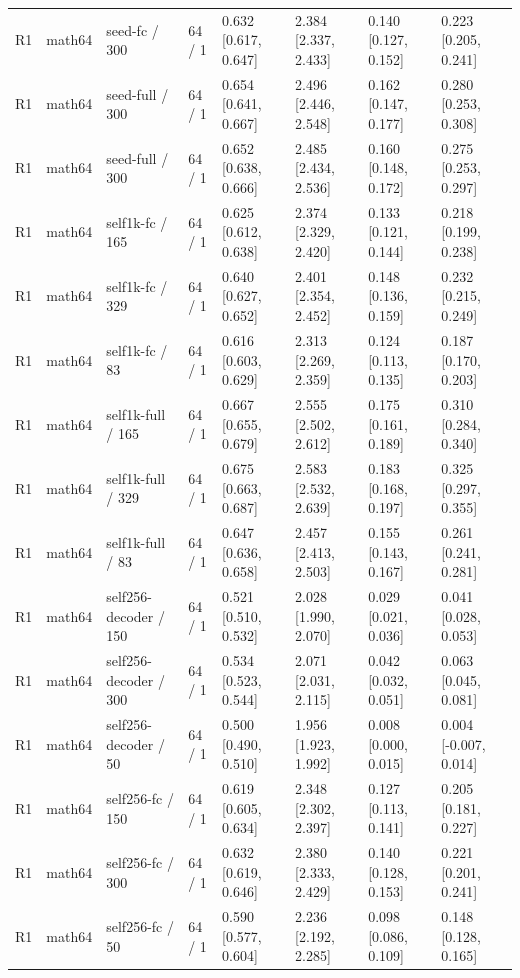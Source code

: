 \begin{tabular}{llllllll}
R1 & math64 & seed-fc / 300 & 64 / 1 & 0.632 [0.617, 0.647] & 2.384 [2.337, 2.433] & 0.140 [0.127, 0.152] & 0.223 [0.205, 0.241] \\
R1 & math64 & seed-full / 300 & 64 / 1 & 0.654 [0.641, 0.667] & 2.496 [2.446, 2.548] & 0.162 [0.147, 0.177] & 0.280 [0.253, 0.308] \\
R1 & math64 & seed-full / 300 & 64 / 1 & 0.652 [0.638, 0.666] & 2.485 [2.434, 2.536] & 0.160 [0.148, 0.172] & 0.275 [0.253, 0.297] \\
R1 & math64 & self1k-fc / 165 & 64 / 1 & 0.625 [0.612, 0.638] & 2.374 [2.329, 2.420] & 0.133 [0.121, 0.144] & 0.218 [0.199, 0.238] \\
R1 & math64 & self1k-fc / 329 & 64 / 1 & 0.640 [0.627, 0.652] & 2.401 [2.354, 2.452] & 0.148 [0.136, 0.159] & 0.232 [0.215, 0.249] \\
R1 & math64 & self1k-fc / 83 & 64 / 1 & 0.616 [0.603, 0.629] & 2.313 [2.269, 2.359] & 0.124 [0.113, 0.135] & 0.187 [0.170, 0.203] \\
R1 & math64 & self1k-full / 165 & 64 / 1 & 0.667 [0.655, 0.679] & 2.555 [2.502, 2.612] & 0.175 [0.161, 0.189] & 0.310 [0.284, 0.340] \\
R1 & math64 & self1k-full / 329 & 64 / 1 & 0.675 [0.663, 0.687] & 2.583 [2.532, 2.639] & 0.183 [0.168, 0.197] & 0.325 [0.297, 0.355] \\
R1 & math64 & self1k-full / 83 & 64 / 1 & 0.647 [0.636, 0.658] & 2.457 [2.413, 2.503] & 0.155 [0.143, 0.167] & 0.261 [0.241, 0.281] \\
R1 & math64 & self256-decoder / 150 & 64 / 1 & 0.521 [0.510, 0.532] & 2.028 [1.990, 2.070] & 0.029 [0.021, 0.036] & 0.041 [0.028, 0.053] \\
R1 & math64 & self256-decoder / 300 & 64 / 1 & 0.534 [0.523, 0.544] & 2.071 [2.031, 2.115] & 0.042 [0.032, 0.051] & 0.063 [0.045, 0.081] \\
R1 & math64 & self256-decoder / 50 & 64 / 1 & 0.500 [0.490, 0.510] & 1.956 [1.923, 1.992] & 0.008 [0.000, 0.015] & 0.004 [-0.007, 0.014] \\
R1 & math64 & self256-fc / 150 & 64 / 1 & 0.619 [0.605, 0.634] & 2.348 [2.302, 2.397] & 0.127 [0.113, 0.141] & 0.205 [0.181, 0.227] \\
R1 & math64 & self256-fc / 300 & 64 / 1 & 0.632 [0.619, 0.646] & 2.380 [2.333, 2.429] & 0.140 [0.128, 0.153] & 0.221 [0.201, 0.241] \\
R1 & math64 & self256-fc / 50 & 64 / 1 & 0.590 [0.577, 0.604] & 2.236 [2.192, 2.285] & 0.098 [0.086, 0.109] & 0.148 [0.128, 0.165] \\

\end{tabular}
